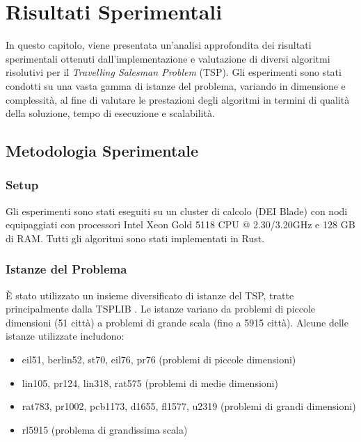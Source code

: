 
%

\chapter{Risultati Sperimentali}
\label{chapt:7}

In questo capitolo, viene presentata un'analisi approfondita dei risultati sperimentali ottenuti dall'implementazione e valutazione di diversi algoritmi risolutivi per il \textit{Travelling Salesman Problem} (TSP). Gli esperimenti sono stati condotti su una vasta gamma di istanze del problema, variando in dimensione e complessità, al fine di valutare le prestazioni degli algoritmi in termini di qualità della soluzione, tempo di esecuzione e scalabilità.

\section{Metodologia Sperimentale}
\label{sec:metodologia}

\subsection{Setup}
Gli esperimenti sono stati eseguiti su un cluster di calcolo (DEI Blade) con nodi equipaggiati con processori Intel Xeon Gold 5118 CPU @ 2.30/3.20GHz e 128 GB di RAM. Tutti gli algoritmi sono stati implementati in Rust.

\subsection{Istanze del Problema}
È stato utilizzato un insieme diversificato di istanze del TSP, tratte principalmente dalla TSPLIB \cite{TSPLIB}. Le istanze variano da problemi di piccole dimensioni (51 città) a problemi di grande scala (fino a 5915 città). Alcune delle istanze utilizzate includono:

\begin{itemize}
	\item eil51, berlin52, st70, eil76, pr76 (problemi di piccole dimensioni)
	\item lin105, pr124, lin318, rat575 (problemi di medie dimensioni)
	\item rat783, pr1002, pcb1173, d1655, fl1577, u2319 (problemi di grandi dimensioni)
	\item rl5915 (problema di grandissima scala)
\end{itemize}

